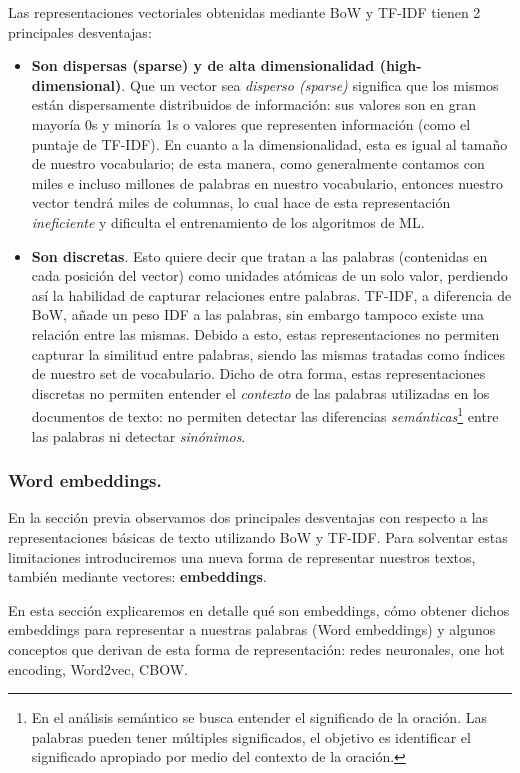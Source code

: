 \documentclass[12pt,a4paper]{article}
\begin{document}
\begin{sloppypar}
Las representaciones vectoriales obtenidas mediante BoW y TF-IDF tienen 2 principales desventajas\cite{NLP_26, NLP_2}: 
\begin{itemize}
\item \textbf{Son dispersas (sparse) y de alta dimensionalidad (high-dimensional)}. Que un vector sea \textit{disperso (sparse)} significa que los mismos están dispersamente distribuidos de información: sus valores son en gran mayoría 0s y minoría 1s o valores que representen información (como el puntaje de TF-IDF). En cuanto a la dimensionalidad, esta es igual al tamaño de nuestro vocabulario; de esta manera, como generalmente contamos con miles e incluso millones de palabras en nuestro vocabulario, entonces nuestro vector tendrá miles de columnas, lo cual hace de esta representación \textit{ineficiente} y dificulta el entrenamiento de los algoritmos de ML. 
\item \textbf{Son discretas}. Esto quiere decir que tratan a las palabras (contenidas en cada posición del vector) como unidades atómicas de un solo valor, perdiendo así la habilidad de capturar relaciones entre palabras. TF-IDF, a diferencia de BoW, añade un peso IDF a las palabras, sin embargo tampoco existe una relación entre las mismas. Debido a esto, estas representaciones no permiten capturar la similitud entre palabras, siendo las mismas tratadas como índices de nuestro set de vocabulario. Dicho de otra forma, estas representaciones discretas no permiten entender el \textit{contexto} de las palabras utilizadas en los documentos de texto: no permiten detectar las diferencias \textit{semánticas}\footnote{En el análisis semántico se busca entender el significado de la oración. Las palabras pueden tener múltiples significados, el objetivo es identificar el significado apropiado por medio del contexto de la oración.} entre las palabras ni detectar \textit{sinónimos}. 
\end{itemize}

\cleardoublepage

\subsubsection{Word embeddings.}\label{word_emb}
En la sección previa observamos dos principales desventajas con respecto a las representaciones básicas de texto utilizando BoW y TF-IDF. Para solventar estas limitaciones introduciremos una nueva forma de representar nuestros textos, también mediante vectores: \textbf{embeddings}. 

En esta sección explicaremos en detalle qué son embeddings, cómo obtener dichos embeddings para representar a nuestras palabras (Word embeddings) y algunos conceptos que derivan de esta forma de representación: redes neuronales, one hot encoding, Word2vec, CBOW.


\end{sloppypar}
\end{document}
